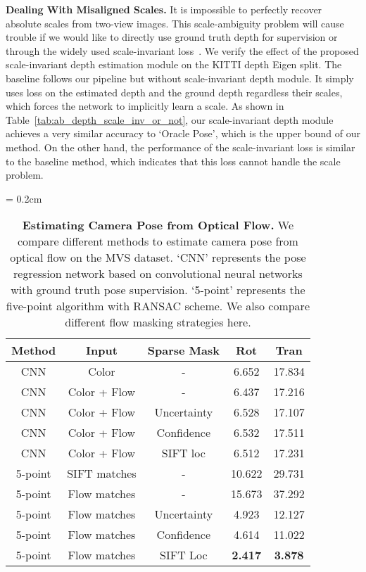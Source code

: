 \documentclass[final]{cvpr}
\begin{document}
\textbf{Dealing With Misaligned Scales.}
It is impossible to perfectly recover absolute scales from two-view images. This scale-ambiguity problem will cause trouble if we would like to directly use ground truth depth for supervision or through the widely used scale-invariant loss~\cite{eigen2014depth,ummenhofer2017demon}. We verify the effect of the proposed scale-invariant depth estimation module on the KITTI depth Eigen split. The baseline follows our pipeline but without scale-invariant depth module. It simply uses  loss on the estimated depth and the ground depth regardless their scales, which forces the network to implicitly learn a scale. As shown in Table~\ref{tab:ab_depth_scale_inv_or_not}, our scale-invariant depth module achieves a very similar accuracy to `Oracle Pose', which is the upper bound of our method. On the other hand, the performance of the scale-invariant loss is similar to the baseline method, which indicates that this loss cannot handle the scale problem. 




\begin{table}
\begin{center}
\tabcolsep = 0.2cm
\caption{\textbf{Estimating Camera Pose from Optical Flow.} We compare different methods to estimate camera pose from optical flow on the MVS dataset. `CNN' represents the pose regression network based on convolutional neural networks with ground truth pose supervision. `5-point' represents the five-point algorithm with RANSAC scheme. We also compare different flow masking strategies here.}
\label{tab:ab_pose_from_flow}
\footnotesize
\begin{tabular}{c | c|c|cc }
\hline
Method& Input & Sparse Mask & Rot & Tran \\
\hline
CNN & Color &-& 6.652& 17.834\\ 
CNN & Color + Flow &-& 6.437& 17.216\\
CNN & Color + Flow & Uncertainty & 6.528& 17.107 \\
CNN & Color + Flow & Confidence & 6.532& 17.511\\

CNN & Color + Flow & SIFT loc & 6.512& 17.231\\
\hline
5-point & SIFT matches & - &10.622&29.731 \\

5-point & Flow matches & - &15.673&37.292 \\
5-point & Flow matches & Uncertainty & 4.923 &12.127 \\
5-point & Flow matches & Confidence & 4.614 &11.022 \\
5-point & Flow matches & SIFT Loc &\textbf{2.417}&\textbf{3.878} \\
\bottomrule
\end{tabular}
\end{center}

\vspace{-6mm}
\end{table}
\end{document}
